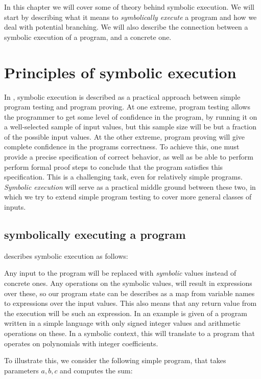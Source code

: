 In this chapter we will cover some of theory behind symbolic execution. We will start by describing what it means to \emph{symbolically execute} a program and how we deal with potential branching. We will also describe the connection between a symbolic execution of a program, and a concrete one. 

\section{Principles of symbolic execution }
	
	In \cite{king76}, symbolic execution is described as a practical approach between simple program testing and program proving. At one extreme, program testing allows the programmer to get some level of confidence in the program, by running it on a well-selected sample of input values, but this sample size will be but a fraction of the possible input values. At the other extreme, program proving will give complete confidence in the programs correctness. To achieve this, one must provide a precise specification of correct behavior, as well as be able to perform perform formal proof steps to conclude that the program satisfies this specification. This is a challenging task, even for relatively simple programs. \emph{Symbolic execution} will serve as a practical middle ground between these two, in which we try to extend simple program testing to cover more general classes of inputs.  

\subsection{symbolically executing a program}
	
	\cite{CadarSen13} describes symbolic execution as follows:
	
	Any input to the program will be replaced with \emph{symbolic} values instead of concrete ones. Any operations on the symbolic values, will result in expressions over these, so our program state can be describes as a map from variable names to expressions over the input values. This also means that any return value from the execution will be such an expression. In \cite{king76} an example is given of a program written in a simple language with only signed integer values and arithmetic operations on these. In a symbolic context, this will translate to a program that operates on polynomials with integer coefficients.   
	
	To illustrate this, we consider the following simple program, that takes parameters $a, b, c$ and computes the sum:
	
